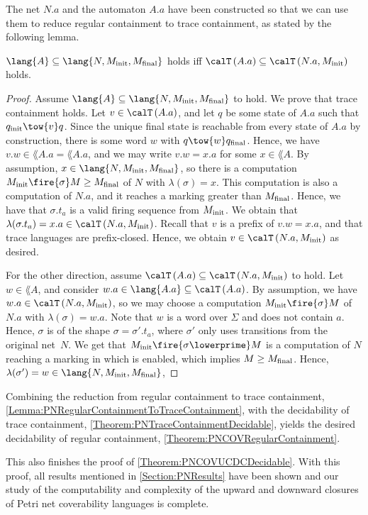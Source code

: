 \documentclass[../../diss.tex]{subfiles}
\begin{document}
The net $N.a$ and the automaton $A.a$ have been constructed so that we can use them to reduce regular containment to trace containment, as stated by the following lemma.

\begin{lemma}%
\label{Lemma:PNRegularContainmentToTraceContainment}%
    $
        \lang{A} \subseteq \lang{N,\Minit, \Mfinal}
    $
    holds iff
    $
        \Traces{A.a} \subseteq \Traces{N.a, \Minit}
    $
    holds.
\end{lemma}

\begin{proof}
    Assume $\lang{A} \subseteq \lang{N,\Minit, \Mfinal}$ to hold.
    We prove that trace containment holds.
    Let $v \in \Traces{A.a}$, and let $q$ be some state of $A.a$ such that $q_\init \tow{v} q$.
    Since the unique final state is reachable from every state of $A.a$ by construction, there is some word $w$ with $q \tow{w} q_\final$.
    Hence, we have $v.w \in \lang{A.a} = \lang{A}.a$, and we may write $v.w = x.a$ for some $x \in \lang{A}$.
    By assumption, $x \in \lang{N,\Minit, \Mfinal}$, so there is a computation $\Minit \fire{\sigma} M \geq \Mfinal$ of $N$ with $\lambda(\sigma) = x$.
    This computation is also a computation of $N.a$, and it reaches a marking greater than $M_{\text{final}}$.
    Hence, we have that $\sigma.t_a$ is a valid firing sequence from $M_{\text{init}}$.
    We obtain that $\lambda(\sigma.t_a) = x.a \in \Traces{N.a,\Minit}$.
    Recall that $v$ is a prefix of $v.w = x.a$, and that trace languages are prefix-closed.
    Hence, we obtain $v \in \Traces{N.a,\Minit}$ as desired.

    For the other direction, assume $\Traces{A.a} \subseteq \Traces{N.a, \Minit}$ to hold.
    Let $w \in \lang{A}$, and consider $w.a \in \lang{A.a} \subseteq \Traces{A.a}$.
    By assumption, we have $w.a \in \Traces{N.a, \Minit}$, so we may choose a computation $\Minit \fire{\sigma} M$ of $N.a$ with $\lambda(\sigma) = w.a$.
    Note that $w$ is a word over $\Sigma$ and does not contain $a$.
    Hence, $\sigma$ is of the shape $\sigma = \sigma'.t_a$, where $\sigma'$ only uses transitions from the original net~$N$.
    We get that $\Minit \fire{\sigma\lowerprime} M$ is a computation of $N$ reaching a marking in which  is enabled, which implies $M \geq M_{\text{final}}$.
    Hence, $\lambda(\sigma') = w \in \lang{N,\Minit,\Mfinal}$, 
\end{proof}

Combining the reduction from regular containment to trace containment, \cref{Lemma:PNRegularContainmentToTraceContainment}, with the decidability of trace containment, \cref{Theorem:PNTraceContainmentDecidable}, yields the desired decidability of regular containment, \cref{Theorem:PNCOVRegularContainment}.

This also finishes the proof of \cref{Theorem:PNCOVUCDCDecidable}.
With this proof, all results mentioned in \cref{Section:PNResults} have been shown and our study of the computability and complexity of the upward and downward closures of Petri net coverability languages is complete.
\end{document}
